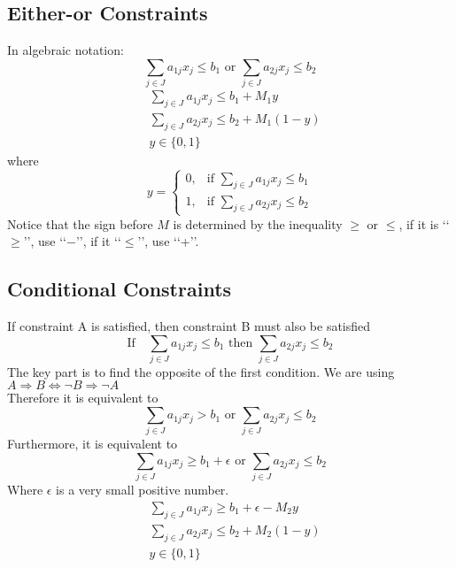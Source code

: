 			\subsection{Either-or Constraints}
				 In algebraic notation: 
				\begin{equation}
					\sum_{j\in J} a_{1j} x_j \le b_1 \text{ or } \sum_{j\in J} a_{2j} x_j \le b_2 \nonumber
				\end{equation}
				\begin{align}
					& \sum_{j\in J} a_{1j} x_j \le b_1 + M_1y \nonumber \\
					& \sum_{j\in J} a_{2j} x_j \le b_2 + M_1(1-y) \nonumber \\
					& y \in \{0, 1\} \nonumber
				\end{align}
				where
				\begin{equation}y=\begin{cases}0, & \text{if }\sum_{j\in J} a_{1j} x_j \le b_1 \\ 1, & \text{if } \sum_{j\in J} a_{2j} x_j \le b_2\end{cases}\nonumber \end{equation}
				Notice that the sign before $M$ is determined by the inequality $\ge$ or $\le$, if it is \lq\lq{}$\ge$\rq\rq{}, use \lq\lq{}$-$\rq\rq{}, if it \lq\lq{}$\le$\rq\rq{}, use \lq\lq{}+\rq\rq{}.
			
			\subsection{Conditional Constraints}
				 If constraint A is satisfied, then constraint B must also be satisfied
				\begin{equation}
					\text{If} \quad \sum_{j\in J} a_{1j} x_j \le b_1 \text{ then } \sum_{j\in J} a_{2j} x_j \le b_2 \nonumber
				\end{equation}
				The key part is to find the opposite of the first condition. We are using $A\Rightarrow B \Leftrightarrow \neg B \Rightarrow \neg A$\\
				Therefore it is equivalent to
				\begin{equation}
					\sum_{j\in J} a_{1j} x_j > b_1 \text{ or } \sum_{j\in J} a_{2j} x_j \le b_2 \nonumber
				\end{equation}
				Furthermore, it is equivalent to
				\begin{equation}
					\sum_{j\in J} a_{1j} x_j \ge b_1 + \epsilon \text{ or } \sum_{j\in J} a_{2j} x_j \le b_2 \nonumber
				\end{equation}
				Where $\epsilon$ is a very small positive number.\\
				\begin{align}
					& \sum_{j\in J} a_{1j} x_j \ge b_1 + \epsilon -  M_2y \nonumber \\
					& \sum_{j\in J} a_{2j} x_j \le b_2 + M_2(1-y) \nonumber \\
					& y \in \{0, 1\} \nonumber
				\end{align}	
			
